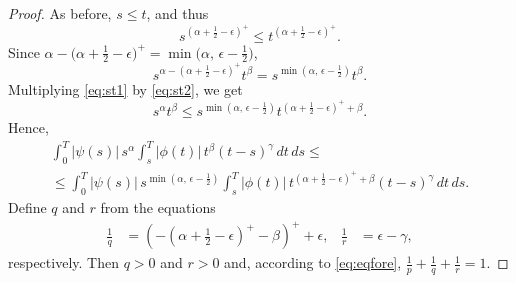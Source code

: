 \documentclass{article}
\theoremstyle{plain}
\theoremstyle{remark}
\theoremstyle{definition}
\begin{document}
\begin{proof}
	As before,
	$s\mathbin{\le}t$, and thus
	\begin{equation}\label{eq:st1}
		s^{\left(\alpha+\frac12-\epsilon\right)^+} \le
		t^{\left(\alpha+\frac12-\epsilon\right)^+}.
	\end{equation}
	Since $\alpha - \bigl(\alpha+\frac12-\epsilon\bigr)^+ = \min\bigl(\alpha,\, \epsilon-\frac12\bigr)$,
	\begin{equation}\label{eq:st2}
		s^{\alpha - \left(\alpha+\frac12-\epsilon\right)^+}  t^\beta =
		s^{\min\left(\alpha,\, \epsilon-\frac12\right)} t^\beta.
	\end{equation}
	Multiplying \eqref{eq:st1} by \eqref{eq:st2}, we get
	\[
		s^\alpha t^\beta \le
		s^{\min\left(\alpha,\, \epsilon-\frac12\right)}
		t^{\left(\alpha+\frac12-\epsilon\right)^+ + \beta}.
	\]
	Hence,
	\begin{multline*}
		\int_0^T |\psi(s)|\, s^\alpha
		\int_s^T |\phi(t)|\, t^\beta (t-s)^\gamma
		\, dt \, ds
		\le \\ \le
		\int_0^T |\psi(s)|\,
		s^{\min\left(\alpha,\, \epsilon-\frac12\right)}
		\int_s^T |\phi(t)|\,
		t^{\left(\alpha+\frac12-\epsilon\right)^+ + \beta}
		(t-s)^\gamma
		\, dt \, ds .
	\end{multline*}
	Define $q$ and $r$ from the equations
	\begin{align*}
		\frac{1}{q} &=
		\left( - \left( \alpha + {\textstyle\frac12} - \epsilon\right)^+
		- \beta\right)^+ + \epsilon, &
		\frac{1}{r} &= \epsilon - \gamma,
	\end{align*}
respectively.
	Then $q>0$ and $r>0$ and, according to \eqref{eq:eqfore},
	$\frac{1}{p}+\frac{1}{q}+\frac{1}{r} = 1$.


\end{proof}
\end{document}
